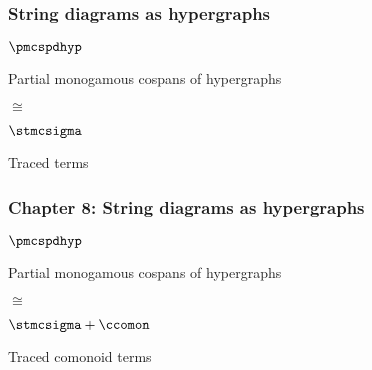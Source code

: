 \begin{frame}
    \frametitle{String diagrams as hypergraphs}

    \pause

    \begin{center}
        \begin{minipage}{0.4\textwidth}
            \centering
            \LARGE
            \(\pmcspdhyp\)

            \Large
            Partial monogamous cospans of hypergraphs

            \vspace{0.5em}

        \end{minipage}
        \qquad
        \pause
        {\LARGE \(\cong\)}
        \begin{minipage}{0.4\textwidth}
            \centering
            \LARGE
            \(\stmcsigma\)

            \Large
            Traced terms

            \vspace{1em}

        \end{minipage}
    \end{center}
\end{frame}

\begin{frame}
    \frametitle{Chapter 8: String diagrams as hypergraphs}

    \pause

    \begin{center}
        \begin{minipage}{0.4\textwidth}
            \centering
            \LARGE
            \(\pmcspdhyp\)

            \Large
            Partial monogamous cospans of hypergraphs

            \vspace{0.5em}

        \end{minipage}
        \qquad
        \pause
        {\LARGE \(\cong\)}
        \qquad
        \begin{minipage}{0.4\textwidth}
            \centering
            \LARGE
            \(\stmcsigma + \ccomon\)

            \Large
            Traced comonoid terms

            \vspace{1em}

            \normalsize
        \end{minipage}
    \end{center}
\end{frame}

